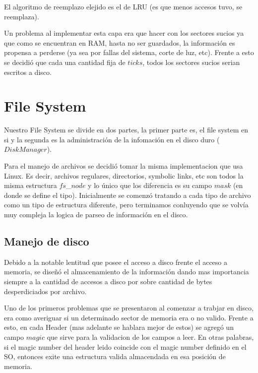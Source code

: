 \documentclass[english]{article}
\begin{document}
El algoritmo de reemplazo elejido es el de LRU (es que menos accesos
tuvo, se reemplaza). 

Un problema al implementar esta capa era que hacer con los sectores
sucios ya que como se encuentran en RAM, hasta no ser guardados, la
información es propensa a perderse (ya sea por fallas del sistema,
corte de luz, etc). Frente a esto se decidió que cada una cantidad
fija de $ticks$, todos los sectores sucios serian escritos a disco. 

\pagebreak{}


\section{File System}

Nuestro File System se divide en dos partes, la primer parte es, el
file system en si y la segunda es la administración de la infomación
en el disco duro ($DiskManager$).

Para el manejo de archivos se decidió tomar la misma implementacion
que usa Linux. Es decir, archivos regulares, directorios, symbolic
links, etc son todos la misma estructura $fs$\_$node$ y lo único
que los diferencia es su campo $mask$ (en donde se define el tipo).
Inicialmente se comenzó tratando a cada tipo de archivo como un tipo
de estructura diferente, pero terminamos conluyendo que se volvía
muy compleja la logica de parseo de información en el disco.


\subsection{Manejo de disco}

Debido a la notable lentitud que posee el acceso a disco frente el
acceso a memoria, se diseñó el almacenamiento de la información dando
mas importancia siempre a la cantidad de accesos a disco por sobre
cantidad de bytes desperdiciados por archivo.

Uno de los primeros problemas que se presentaron al comenzar a trabjar
en disco, era como averiguar si un determinado sector de memoria era
o no valido. Frente a esto, en cada Header (mas adelante se hablara
mejor de estos) se agregó un campo $magic$ que sirve para la validacion
de los campos a leer. En otras palabras, si el magic number del header
leido coincide con el magic number definido en el SO, entonces exite
una estructura valida almacendada en esa posición de memoria. \\
\end{document}
